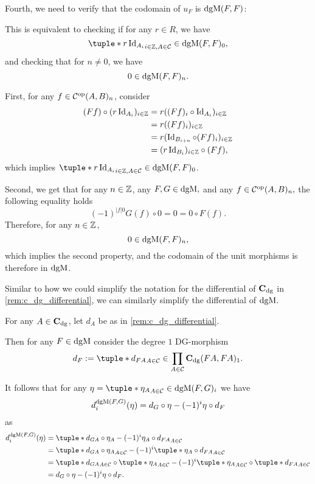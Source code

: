 \begin{remark}
    Fourth, we need to verify that the codomain of \( u_F \) is \( \operatorname{dgM}(F, F) \):
    
    This is equivalent to checking if for any \( r \in R \), we have
    \[
        \tuple*{ r \Id_{A_i} }_{i \in \Zb, A \in \Cc} \in \dgM(F, F)_0,
    \]
    and checking that for \( n \neq 0 \), we have
    \[
        0 \in \operatorname{dgM}(F, F)_n.
    \]

    First, for any \( f \in {\mathcal{C}}^{\operatorname{op}}(A, B)_n \), consider
    \begin{align*}
        (F f) \circ (r \operatorname{Id}_{A_i})_{i \in {\mathbb{Z}}} &= r ((F f)_i \circ \operatorname{Id}_{A_i})_{i \in {\mathbb{Z}}} \\
        &= r ((F f)_i)_{i \in {\mathbb{Z}}} \\
        &= r (\operatorname{Id}_{B_{i + n}} \circ (F f)_i)_{i \in {\mathbb{Z}}} \\
        &= (r \operatorname{Id}_{B_i})_{i \in {\mathbb{Z}}} \circ (F f),
    \end{align*}
    which implies \( \tuple*{ r \Id_{A_i} }_{i \in \Zb, A \in \Cc} \in \dgM(F, F)_0 \).

    Second, we get that for any \( n \in {\mathbb{Z}} \), any \( F, G \in \operatorname{dgM}, \) and any \( f \in {\mathcal{C}}^{\operatorname{op}}(A, B)_n, \) the following equality holds
    \[
        (-1)^{|f|0}G(f) \circ 0 = 0 = 0 \circ F(f).
    \]
    Therefore, for any \( n \in {\mathbb{Z}} \),
    \[
        0 \in \operatorname{dgM}(F, F)_n,
    \]
    which implies the second property, and the codomain of the unit morphisms is therefore in \( \operatorname{dgM} \).
\end{remark}

Similar to how we could simplify the notation for the differential of \( \operatorname{\mathbf{C}}_{\operatorname{dg}} \) in \autoref{rem:c_dg_differential}, we can similarly simplify the differential of \( \operatorname{dgM} \).

\begin{remark}
    For any \( A \in \operatorname{\mathbf{C}}_{\operatorname{dg}} \), let \( d_A \) be as in \autoref{rem:c_dg_differential}.

    Then for any \( F \in \operatorname{dgM} \) consider the degree \( 1 \) DG-morphism
    \[
        d_F := \tuple*{d_{FA}}_{A \in \Cc} \in \prod_{A \in \Cc} \C_{\dg}(FA, FA)_1.
    \]

    It follows that for any \( \eta = \tuple*{\eta_A}_{A \in \Cc} \in \dgM(F, G)_i \) we have
    \[
        d_i^{\operatorname{dgM}(F, G)}(\eta) = d_G \circ \eta - (-1)^i \eta \circ d_F
    \]
    as
    \begin{align*}
        d_i^{\dgM(F, G)}(\eta) &= \tuple*{ d_{G A} \circ \eta_A - (-1)^i \eta_A \circ d_{F A} }_{A \in \Cc} \\
        &= \tuple*{ d_{G A} \circ \eta_A }_{A \in \Cc} - (-1)^i \tuple*{ \eta_A \circ d_{F A} }_{A \in \Cc} \\
        &= \tuple*{d_{G A}}_{A \in \Cc} \circ \tuple*{\eta_A}_{A \in \Cc} - (-1)^i \tuple*{\eta_A}_{A \in \Cc} \circ \tuple*{d_{F A}}_{A \in \Cc} \\
        &= d_G \circ \eta - (-1)^i \eta \circ d_F.
    \end{align*}
\end{remark}

